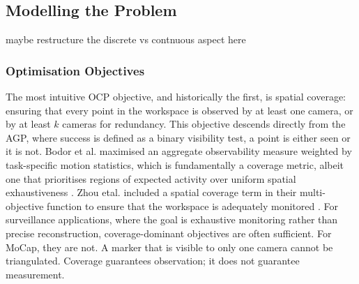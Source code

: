 \subsection{Modelling the Problem}
maybe restructure the discrete vs contnuous aspect here 

\subsubsection{Optimisation Objectives}

The most intuitive \gls{OCP} objective, and historically the first, is spatial coverage: ensuring that every point in the workspace is observed by at least one camera, or by at least $k$ cameras for redundancy. This objective descends directly from the \gls{AGP}, where success is defined as a binary visibility test, a point is either seen or it is not. Bodor et al. maximised an aggregate observability measure weighted by task-specific motion statistics, which is fundamentally a coverage metric, albeit one that prioritises regions of expected activity over uniform spatial exhaustiveness \parencite{bodorOptimalCameraPlacement2007}. Zhou etal. included a spatial coverage term in their multi-objective function to ensure that the workspace is adequately monitored \parencite{zhouSensorPlacementOptimization2024}. For surveillance applications, where the goal is exhaustive monitoring rather than precise reconstruction, coverage-dominant objectives are often sufficient. For \gls{MoCap}, they are not. A marker that is visible to only one camera cannot be triangulated. Coverage guarantees observation; it does not guarantee measurement.

